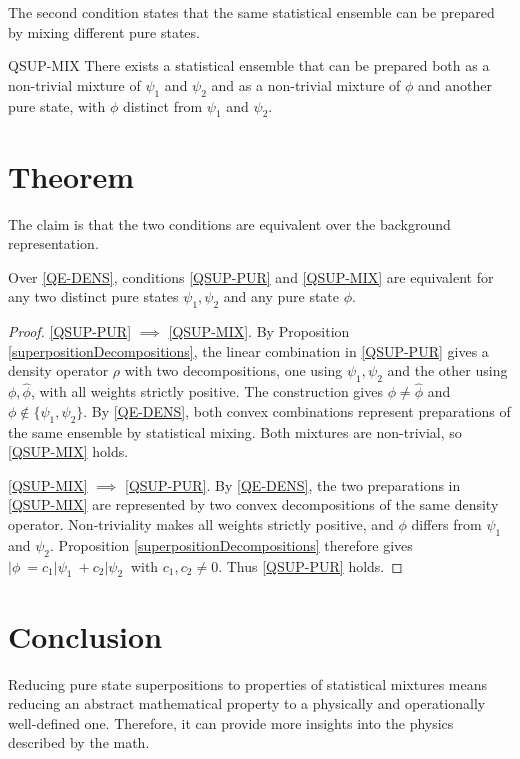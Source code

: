 \documentclass{techbrief}
\begin{document}
The second condition states that the same statistical ensemble can be prepared by mixing different pure states.

\begin{condition}{QSUP-MIX}
	There exists a statistical ensemble that can be prepared both as a non-trivial mixture of $\psi_1$ and $\psi_2$ and as a non-trivial mixture of $\phi$ and another pure state, with $\phi$ distinct from $\psi_1$ and $\psi_2$.
\end{condition}

\section{Theorem}

The claim is that the two conditions are equivalent over the background representation.

\begin{thrm}
	Over \ref{QE-DENS}, conditions \ref{QSUP-PUR} and \ref{QSUP-MIX} are equivalent for any two distinct pure states $\psi_1,\psi_2$ and any pure state $\phi$.
\end{thrm}

\begin{proof}
	\ref{QSUP-PUR} $\implies$ \ref{QSUP-MIX}.
	By Proposition \ref{superpositionDecompositions}, the linear combination in \ref{QSUP-PUR} gives a density operator $\rho$ with two decompositions, one using $\psi_1,\psi_2$ and the other using $\phi,\hat{\phi}$, with all weights strictly positive. The construction gives $\phi\neq\hat{\phi}$ and $\phi\notin\{\psi_1,\psi_2\}$. By \ref{QE-DENS}, both convex combinations represent preparations of the same ensemble by statistical mixing. Both mixtures are non-trivial, so \ref{QSUP-MIX} holds.

	\ref{QSUP-MIX} $\implies$ \ref{QSUP-PUR}.
	By \ref{QE-DENS}, the two preparations in \ref{QSUP-MIX} are represented by two convex decompositions of the same density operator. Non-triviality makes all weights strictly positive, and $\phi$ differs from $\psi_1$ and $\psi_2$. Proposition \ref{superpositionDecompositions} therefore gives $|\phi\>=c_1|\psi_1\>+c_2|\psi_2\>$ with $c_1,c_2\neq0$. Thus \ref{QSUP-PUR} holds.
\end{proof}

\section{Conclusion}

Reducing pure state superpositions to properties of statistical mixtures means reducing an abstract mathematical property to a physically and operationally well-defined one. Therefore, it can provide more insights into the physics described by the math.
\end{document}
